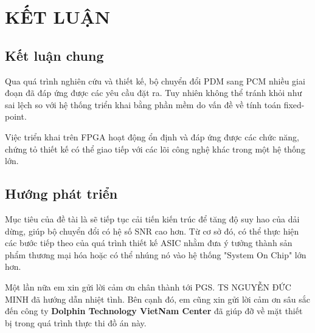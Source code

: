 \section*{KẾT LUẬN} \label{ketluan}
\subsection*{Kết luận chung}

Qua quá trình nghiên cứu và thiết kế, bộ chuyển đổi PDM sang PCM nhiều giai đoạn đã đáp ứng được các yêu cầu đặt ra. Tuy nhiên không thể tránh khỏi như sai lệch so với hệ thống triển khai bằng phần mềm do vấn đề về tính toán fixed-point.

Việc triển khai trên FPGA hoạt động ổn định và đáp ứng được các chức năng, chứng tỏ thiết kế có thể giao tiếp với các lõi công nghệ khác trong một hệ thống lớn.

\subsection*{Hướng phát triển}
Mục tiêu của đề tài là sẽ tiếp tục cải tiến kiến trúc để tăng độ suy hao của dải dừng, giúp bộ chuyển đổi có hệ số SNR cao hơn. Từ cơ sở đó, có thể thực hiện các bước tiếp theo của quá trình thiết kế ASIC nhằm đưa ý tưởng thành sản phẩm thương mại hóa hoặc có thể nhúng nó vào hệ thống "System On Chip" lớn hơn.


Một lần nữa em xin gửi lời cảm ơn chân thành tới PGS. TS NGUYỄN ĐỨC MINH đã hướng dẫn nhiệt tình. Bên cạnh đó, em cũng xin gửi lời cảm ơn sâu sắc đến công ty \textbf{Dolphin Technology VietNam Center} đã giúp đỡ về mặt thiết bị trong quá trình thực thi đồ án này.

\newpage